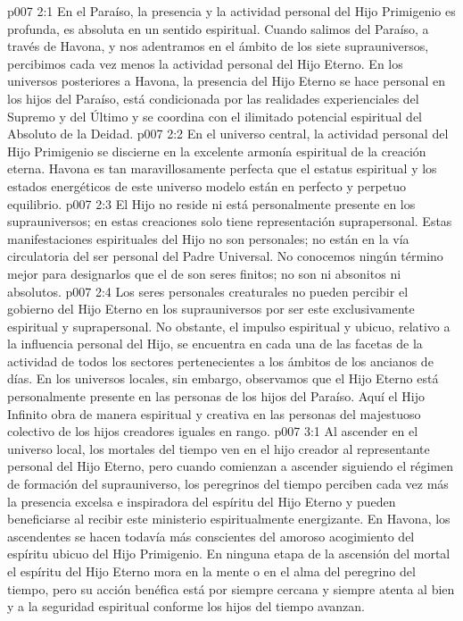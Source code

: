 \vs p007 2:1 En el Paraíso, la presencia y la actividad personal del Hijo Primigenio es profunda, es absoluta en un sentido espiritual. Cuando salimos del Paraíso, a través de Havona, y nos adentramos en el ámbito de los siete suprauniversos, percibimos cada vez menos la actividad personal del Hijo Eterno. En los universos posteriores a Havona, la presencia del Hijo Eterno se hace personal en los hijos del Paraíso, está condicionada por las realidades experienciales del Supremo y del Último y se coordina con el ilimitado potencial espiritual del Absoluto de la Deidad.
\vs p007 2:2 En el universo central, la actividad personal del Hijo Primigenio se discierne en la excelente armonía espiritual de la creación eterna. Havona es tan maravillosamente perfecta que el estatus espiritual y los estados energéticos de este universo modelo están en perfecto y perpetuo equilibrio.
\vs p007 2:3 El Hijo no reside ni está personalmente presente en los suprauniversos; en estas creaciones solo tiene representación suprapersonal. Estas manifestaciones espirituales del Hijo no son personales; no están en la vía circulatoria del ser personal del Padre Universal. No conocemos ningún término mejor para designarlos que el de  son seres finitos; no son ni absonitos ni absolutos.
\vs p007 2:4 Los seres personales creaturales no pueden percibir el gobierno del Hijo Eterno en los suprauniversos por ser este exclusivamente espiritual y suprapersonal. No obstante, el impulso espiritual y ubicuo, relativo a la influencia personal del Hijo, se encuentra en cada una de las facetas de la actividad de todos los sectores pertenecientes a los ámbitos de los ancianos de días. En los universos locales, sin embargo, observamos que el Hijo Eterno está personalmente presente en las personas de los hijos del Paraíso. Aquí el Hijo Infinito obra de manera espiritual y creativa en las personas del majestuoso colectivo de los hijos creadores iguales en rango.
\vs p007 3:1 Al ascender en el universo local, los mortales del tiempo ven en el hijo creador al representante personal del Hijo Eterno, pero cuando comienzan a ascender siguiendo el régimen de formación del suprauniverso, los peregrinos del tiempo perciben cada vez más la presencia excelsa e inspiradora del espíritu del Hijo Eterno y pueden beneficiarse al recibir este ministerio espiritualmente energizante. En Havona, los ascendentes se hacen todavía más conscientes del amoroso acogimiento del espíritu ubicuo del Hijo Primigenio. En ninguna etapa de la ascensión del mortal el espíritu del Hijo Eterno mora en la mente o en el alma del peregrino del tiempo, pero su acción benéfica está por siempre cercana y siempre atenta al bien y a la seguridad espiritual conforme los hijos del tiempo avanzan.

